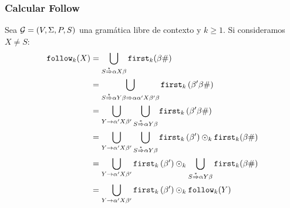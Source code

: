 \subsubsection{Calcular Follow}
Sea $\mathcal{G}=(V,\Sigma,P,S)$ una gramática libre de contexto y $k\ge 1$.
Si consideramos $X\neq S$:
\begin{align*}
    \texttt{follow}_k(X) & =\bigcup_{S \stackrel{\star}{\Rightarrow} \alpha X \beta} \texttt{first}_k(\beta \#)                                                                                                      \\
                 & =\bigcup_{S \stackrel{\star}{\Rightarrow} \alpha Y \beta \Rightarrow \alpha \alpha^{\prime} X \beta^{\prime} \beta} \texttt{first}_k\left(\beta^{\prime} \beta \#\right)                  \\
                 & =\bigcup_{Y \rightarrow \alpha^{\prime} X \beta^{\prime}} \bigcup_{S \overset{*}{\Rightarrow}\alpha Y \beta} \texttt{first}_k\left(\beta^{\prime} \beta \#\right)                         \\
                 & =\bigcup_{Y \rightarrow \alpha^{\prime} X \beta^{\prime}} \bigcup_{S \stackrel{\star}{\Rightarrow} \alpha Y \beta} \texttt{first}_k\left(\beta^{\prime}\right) \odot_k \texttt{first}_k(\beta \#) \\
                 & =\bigcup_{Y \rightarrow \alpha^{\prime} X \beta^{\prime}} \texttt{first}_k\left(\beta^{\prime}\right) \odot_k \bigcup_{S \stackrel{*}{\Rightarrow} \alpha Y \beta} \texttt{first}_k(\beta \#)     \\
                 & =\bigcup_{Y \rightarrow \alpha^{\prime} X \beta^{\prime}} \texttt{first}{ }_k\left(\beta^{\prime}\right) \odot_k \texttt{follow}_k(Y)                                                             \\
                 &
\end{align*}

